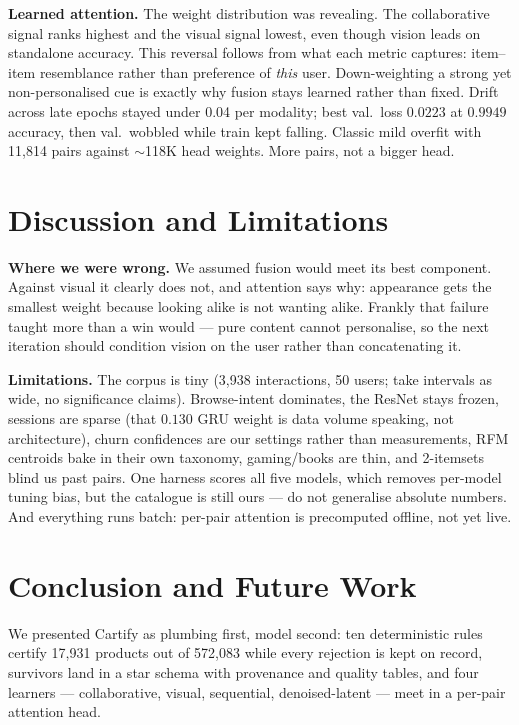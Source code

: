 \documentclass[conference]{IEEEtran}
\begin{document}
\textbf{Learned attention.} The weight distribution was revealing. The collaborative
signal ranks highest and the visual signal lowest, even though vision leads on
standalone accuracy. This reversal follows from what each metric captures:
item--item resemblance rather than preference of \emph{this} user. Down-weighting a
strong yet non-personalised cue is exactly why fusion stays learned rather than
fixed. Drift across
late epochs stayed under 0.04 per modality; best val.\ loss $0.0223$ at $0.9949$
accuracy, then val.\ wobbled while train kept falling. Classic mild overfit with
11{,}814 pairs against $\sim$118K head weights. More pairs, not a bigger head.

\section{Discussion and Limitations}
\label{sec:discussion}

\textbf{Where we were wrong.} We assumed fusion would meet its best component. Against
visual it clearly does not, and attention says why: appearance gets the smallest
weight because looking alike is not wanting alike. Frankly that failure taught more
than a win would --- pure content cannot personalise, so the next iteration should
condition vision on the user rather than concatenating it.

\textbf{Limitations.} The corpus is tiny (3{,}938 interactions, 50 users; take intervals
as wide, no significance claims). Browse-intent dominates, the ResNet stays frozen,
sessions are sparse (that $0.130$ GRU weight is data volume speaking, not architecture),
churn confidences are our settings rather than measurements, RFM centroids bake in
their own taxonomy, gaming/books are thin, and 2-itemsets blind us past pairs.
One harness scores all five models, which removes per-model tuning bias, but the
catalogue is still ours --- do not generalise absolute numbers. And everything runs
batch: per-pair attention is precomputed offline, not yet live.

\section{Conclusion and Future Work}
\label{sec:conclusion}

We presented Cartify as plumbing first, model second: ten deterministic rules certify
17{,}931 products out of 572{,}083 while every rejection is kept on record, survivors
land in a star schema with provenance and quality tables, and four learners ---
collaborative, visual, sequential, denoised-latent --- meet in a per-pair attention
head.
\end{document}
